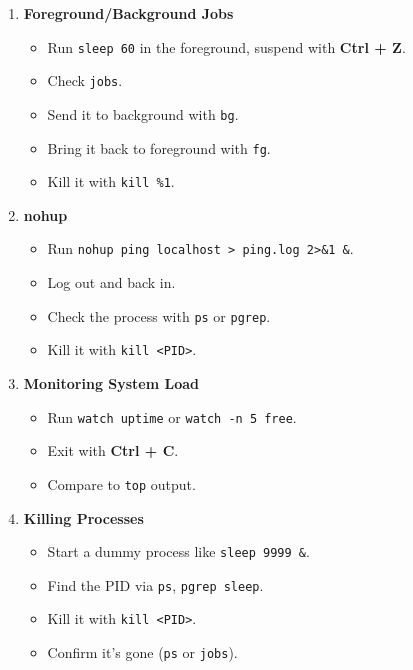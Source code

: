 \documentclass[a4paper]{report}
\begin{document}
    \begin{enumerate}
        \item \textbf{Foreground/Background Jobs}
        \begin{itemize}
            \item Run \texttt{sleep 60} in the foreground, suspend with \textbf{Ctrl + Z}.
            \item Check \texttt{jobs}.
            \item Send it to background with \texttt{bg}.
            \item Bring it back to foreground with \texttt{fg}.
            \item Kill it with \texttt{kill \%1}.
        \end{itemize}
    
        \item \textbf{nohup}
        \begin{itemize}
            \item Run \texttt{nohup ping localhost > ping.log 2>\&1 \&}.
            \item Log out and back in.
            \item Check the process with \texttt{ps} or \texttt{pgrep}.
            \item Kill it with \texttt{kill <PID>}.
        \end{itemize}
    
        \item \textbf{Monitoring System Load}
        \begin{itemize}
            \item Run \texttt{watch uptime} or \texttt{watch -n 5 free}.
            \item Exit with \textbf{Ctrl + C}.
            \item Compare to \texttt{top} output.
        \end{itemize}
    
        \item \textbf{Killing Processes}
        \begin{itemize}
            \item Start a dummy process like \texttt{sleep 9999 \&}.
            \item Find the PID via \texttt{ps}, \texttt{pgrep sleep}.
            \item Kill it with \texttt{kill <PID>}.
            \item Confirm it’s gone (\texttt{ps} or \texttt{jobs}).
        \end{itemize}
    

\end{enumerate}
\end{document}
